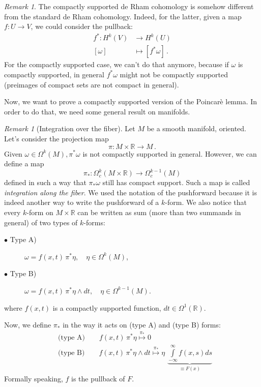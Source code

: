 \documentclass[a4paper,11pt,titlepage, article, oneside]{memoir}
\numberwithin{equation}{section}
\theoremstyle{definition}
\theoremstyle{remark}
\newtheorem{remark}[theorem]{Remark}
\newcommand{\rfield}{\mathbb{R}}
\begin{document}
\begin{remarkbox}
\begin{remark}
The compactly supported de Rham cohomology is somehow different from the standard de Rham cohomology. Indeed, for the latter, given a map $f \colon U \rightarrow V$, we could consider the pullback:
\begin{align*}
f^* \colon H^k(V) &\rightarrow H^k(U) \\
[\omega] &\mapsto [f^* \omega] \, .
\end{align*}
For the compactly supported case, we can't do that anymore, because if $\omega$ is compactly supported, in general $f^* \omega$ might not be compactly supported (preimages of compact sets are not compact in general).
\end{remark}
\end{remarkbox}

Now, we want to prove a compactly supported version of the Poincarè lemma. In order to do that, we need some general result on manifolds.

\begin{remarkbox}
\begin{remark}[Integration over the fiber] \label{intfiberrem}
Let $M$ be a smooth manifold, oriented. Let's consider the projection map
\begin{equation}
\pi \colon M \times \rfield \rightarrow M \, .
\end{equation}
Given $\omega \in \Omega^k(M), \pi^*\omega$ is not compactly supported in general. However, we can define a map 
\begin{equation}
\pi_* \colon \Omega_c^k(M \times \rfield) \rightarrow \Omega_c^{k-1}(M)
\end{equation}
defined in such a way that $\pi_* \omega$ still has compact support. Such a map is called \textit{integration along the fiber}. We used the notation of the pushforward because it is indeed another way to write the pushforward of a $k$-form. 
We also notice that every $k$-form on $M \times \rfield$ can be written as sum (more than two summands in general) of two types of $k$-forms:
\begin{description}
\item[$\bullet $ Type A)] $\omega = f(x, t) \, \pi^* \eta, \quad \eta \in \Omega^k(M)$,
\item[$\bullet$ Type B)] $\omega = f(x, t)\, \pi^*\eta \wedge dt, \quad \eta \in \Omega^{k-1}(M)$.
\end{description}
where $f(x, t)$ is a compactly supported function, $dt \in \Omega^1(\rfield)$.

Now, we define $\pi_*$ in the way it acts on (type A) and (type B) forms:
\begin{align}
&\text{(type A)} \qquad  f(x, t) \, \pi^* \eta \overset{\pi_*}{\longmapsto}  0  \label{typea} \\
&\text{(type B)}\qquad  f(x,t) \, \pi^*\eta \wedge dt \overset{\pi_*}{\longmapsto} \eta \, \,  \underbrace{\int\limits_{-\infty}^{\infty} f(x, s) ds }_{\equiv F(x)}  \label{typeb} 
\end{align}
Formally speaking, $f$ is the pullback of $F$.
\end{remark}
\end{remarkbox}
\end{document}
